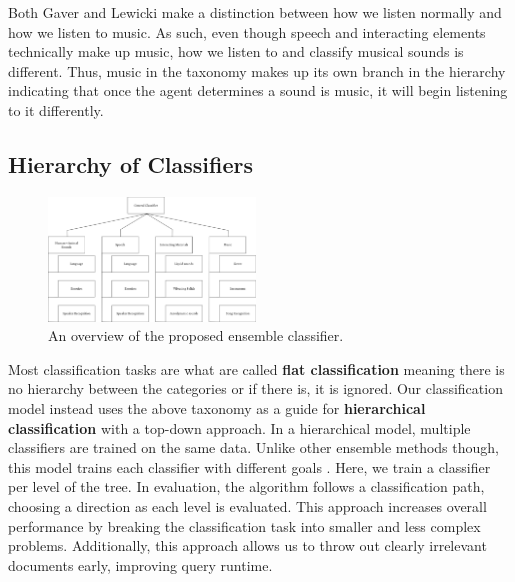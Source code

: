 Both Gaver and Lewicki make a distinction between how we listen normally and how
we listen to music. As such, even though speech and interacting elements
technically make up music, how we listen to and classify musical sounds is
different. Thus, music in the taxonomy makes up its own branch in the hierarchy
indicating that once the agent determines a sound is music, it will begin
listening to it differently.

\subsection{Hierarchy of Classifiers}



\begin{figure}[h!]
    \centering
    \includegraphics[width=0.49\textwidth]{figures/ensemble-overview.png}
    \caption{An overview of the proposed ensemble classifier.}
    \label{fig:classifier-hierarchy}
\end{figure}

Most classification tasks are what are called \textbf{flat classification}
meaning there is no hierarchy between the categories or if there is, it is
ignored. Our classification model instead uses the above taxonomy as a guide for \textbf{hierarchical classification} with a top-down approach. In a hierarchical model, multiple classifiers are trained on the same data. Unlike other ensemble methods though, this model trains each classifier with different goals \cite{chou-hierarchical-2003}. Here, we train a classifier per level of the tree. In evaluation, the algorithm follows a classification path, choosing a direction as each level is evaluated. This approach increases overall performance by breaking the classification task into smaller and less complex problems. Additionally, this approach allows us to throw out clearly irrelevant documents early, improving query runtime.

